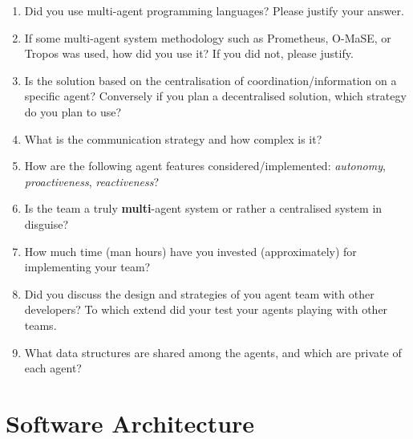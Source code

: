 \documentclass{llncs}
\begin{document}
\begin{enumerate}
 \item Did you use multi-agent programming languages? Please justify your answer.
 \item If some multi-agent system methodology such as Prometheus,
   O-MaSE, or Tropos was used, how did you use it? If you did not, please justify.
 \item Is the solution based on the centralisation of
   coordination/information on a specific agent? Conversely if you
   plan a decentralised solution, which strategy do you plan to use?
 \item What is the communication strategy and how complex is it?
 \item How are the following agent features considered/implemented:
   \emph{autonomy}, \emph{proactiveness}, \emph{reactiveness}?
 \item Is the team a truly \textbf{multi}-agent system or rather a
   centralised system in disguise?
\item How much time (man hours) have you invested (approximately) for implementing your team?
\item Did you discuss the design and strategies of you agent team with other developers? To which extend did your test your agents playing with other teams.
\item What data structures are shared among the agents, and which are private of each agent?
\end{enumerate}

\section{Software Architecture}
\end{document}
